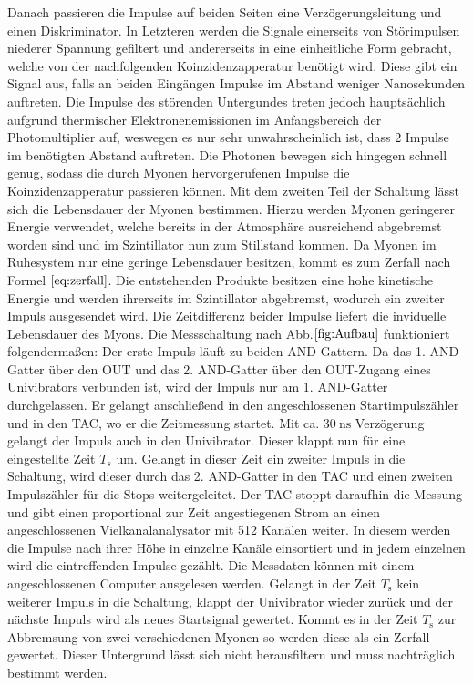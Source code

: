    Danach passieren die Impulse auf beiden Seiten eine Verzögerungsleitung und einen Diskriminator. In Letzteren werden die Signale einerseits von Störimpulsen niederer Spannung gefiltert und andererseits in eine einheitliche Form gebracht, welche von der nachfolgenden Koinzidenzapperatur benötigt wird.
     Diese gibt ein Signal aus, falls an beiden Eingängen Impulse im Abstand weniger Nanosekunden auftreten. Die Impulse des störenden Untergundes treten jedoch hauptsächlich aufgrund thermischer Elektronenemissionen im Anfangsbereich der Photomultiplier auf, weswegen es nur sehr unwahrscheinlich ist, dass 2 Impulse im benötigten Abstand auftreten. Die Photonen bewegen sich hingegen schnell genug, sodass die durch Myonen hervorgerufenen Impulse die Koinzidenzapperatur passieren können.
    Mit dem zweiten Teil der Schaltung lässt sich die Lebensdauer der Myonen bestimmen. Hierzu werden Myonen geringerer Energie verwendet, welche bereits in der Atmosphäre ausreichend abgebremst worden sind und im Szintillator nun zum Stillstand kommen.
    Da Myonen im Ruhesystem nur eine geringe Lebensdauer besitzen, kommt es zum Zerfall nach Formel $\eqref{eq:zerfall}$. Die entstehenden Produkte besitzen eine hohe kinetische Energie und werden ihrerseits im Szintillator abgebremst, wodurch ein zweiter Impuls ausgesendet wird. Die Zeitdifferenz beider Impulse liefert die inviduelle Lebensdauer des Myons. Die Messschaltung nach Abb.$ \ref{fig:Aufbau}$ funktioniert folgendermaßen:
    Der erste Impuls läuft zu beiden AND-Gattern. Da das 1. AND-Gatter über den $\overline{\text{OUT}}$  und das 2. AND-Gatter über den OUT-Zugang eines Univibrators verbunden ist, wird der Impuls nur am 1. AND-Gatter durchgelassen. Er gelangt anschließend in den angeschlossenen Startimpulszähler und in den TAC, wo er die Zeitmessung startet. Mit ca. $\SI{30}{\nano\second}$ Verzögerung gelangt der Impuls auch in den Univibrator. Dieser klappt nun für eine eingestellte Zeit $T_s$ um. Gelangt in dieser Zeit ein zweiter Impuls in die Schaltung, wird dieser durch das 2. AND-Gatter in den TAC und einen zweiten Impulszähler für die Stops weitergeleitet. Der TAC stoppt daraufhin die Messung und gibt einen proportional zur Zeit angestiegenen Strom an einen angeschlossenen Vielkanalanalysator mit 512 Kanälen weiter. In diesem werden die Impulse nach ihrer Höhe in einzelne Kanäle einsortiert und in jedem einzelnen wird die eintreffenden Impulse gezählt. Die Messdaten können mit einem angeschlossenen Computer ausgelesen werden. Gelangt in der Zeit $T_\text{s}$ kein weiterer Impuls in die Schaltung, klappt der Univibrator wieder zurück und der nächste Impuls wird als neues Startsignal gewertet. Kommt es in der Zeit $T_\text{s}$ zur Abbremsung von zwei verschiedenen Myonen so werden diese als ein Zerfall gewertet. Dieser Untergrund lässt sich nicht herausfiltern und muss nachträglich bestimmt werden.